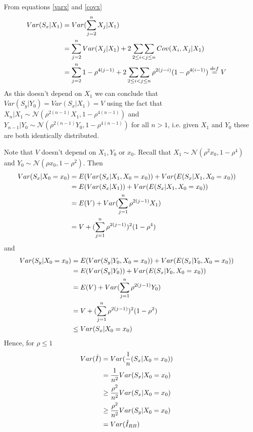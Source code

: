 \documentclass[12pt, leqno]{article}
\providecommand{\normd}{\mathcal{N}} %
\begin{document}
From equations \ref{varx} and \ref{covx}
\begin{align}
Var(S_x|X_1) &= Var(\sum_{j=2}^n X_j|X_1) \notag \\
&= \sum_{j=2}^n Var (X_j|X_1) + 2 \mathop{\sum \sum}_{2\leq i < j \leq n } Cov
(X_i,X_j|X_1) \notag \\
&= \sum_{j=2}^n 1-\rho^{4(j-1)}+ 2 \mathop{\sum \sum}_{2\leq i < j
  \leq n } \rho^{2(j-i)}(1-\rho^{4(i-1)}) \stackrel{def}{=} V \notag 
\end{align}
As this doesn't depend on $X_1$ we can conclude that $Var(S_y|Y_0) =
Var(S_x|X_1) = V$ using the fact that $X_n|X_1 \sim
\normd(\rho^{2(n-1)}X_1,1-\rho^{4(n-1)})$ and $Y_{n-1}|Y_0 \sim
\normd(\rho^{2(n-1)}Y_0,1-\rho^{4(n-1)})$ for all $n>1$, i.e. given $X_1$ and $Y_0$
these are both identically distributed.

Note that $V$ doesn't depend on $X_1,Y_0$ or
$x_0$. Recall that $X_1 \sim \normd (\rho^2 x_0, 1- \rho^4)$ and $Y_0 \sim \normd (\rho x_0, 1- \rho^2)$. Then 
\begin{align}
Var(S_x|X_0 = x_0) &= E(Var(S_x|X_1,X_0 = x_0)) + Var(E(S_x|X_1,X_0 =
x_0)) \notag \\
&= E(Var(S_x|X_1)) + Var(E(S_x|X_1,X_0 =
x_0)) \notag \\
&= E(V) + Var(\sum_{j=1}^n\rho^{2(j-1)}X_1) \notag \\
&= V + (\sum_{j=1}^n\rho^{2(j-1)})^2(1-\rho^4) \label{varsx}
\end{align} 
and 
\begin{align}
Var(S_y|X_0 = x_0) &= E(Var(S_y|Y_0,X_0 = x_0)) + Var(E(S_x|Y_0,X_0 =
x_0)) \notag \\
&= E(Var(S_y|Y_0)) + Var(E(S_x|Y_0,X_0 =
x_0)) \notag \\
&= E(V) + Var(\sum_{j=1}^n\rho^{2(j-1)}Y_0) \notag \\
&= V + (\sum_{j=1}^n\rho^{2(j-1)})^2(1-\rho^2) \notag\\
&\leq Var(S_x|X_0 = x_0) \label{varsy}
\end{align} 
Hence, for $\rho\leq 1$
\begin{align}
Var(\hat{I}) &= Var(\frac{1}{n}(S_x|X_0 = x_0)) \notag \\ 
&= \frac{1}{n^2}Var(S_x|X_0 = x_0) \notag \\ 
& \geq \frac{\rho^2}{n^2}Var(S_x|X_0 = x_0) \notag \\
& \geq \frac{\rho^2}{n^2}Var(S_y|X_0 = x_0) \notag \\
& = Var(\hat{I}_{RB}) \label{varcomp}
\end{align}
\end{document}
